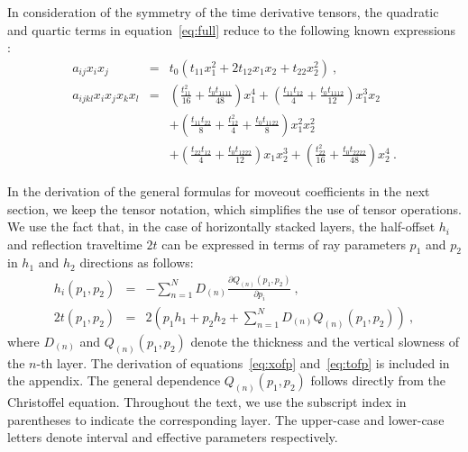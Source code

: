 In consideration of the symmetry of the time derivative tensors, the quadratic and quartic terms in equation~\ref{eq:full} reduce to the following known expressions \cite[]{alortho}:
\begin{eqnarray}
\label{eq:coeffgeneralsymmetric}
a_{ij}x_ix_j & = & t_0\left( t_{11}x^2_1 + 2t_{12}x_1 x_2 + t_{22} x^2_2 \right)~,\\
a_{ijkl}x_ix_jx_kx_l & = & \left( \frac{t^2_{11}}{16} + \frac{t_0t_{1111}}{48}\right)x^4_1 + \left( \frac{t_{11}t_{12}}{4} + \frac{t_0t_{1112}}{12}\right)x^3_1 x_2 ~\\
\nonumber
    && + \left( \frac{t_{11}t_{22}}{8} + \frac{t^2_{12}}{4} + \frac{t_0t_{1122}}{8}\right)x^2_1 x^2_2\\
\nonumber
    && + \left( \frac{t_{22}t_{12}}{4} + \frac{t_0t_{1222}}{12}\right) x_1 x^3_2 + \left( \frac{t^2_{22}}{16} + \frac{t_0t_{2222}}{48}\right)x^4_2~.
\end{eqnarray}


In the derivation of the general formulas for moveout coefficients in the next section, we keep the  tensor notation, which simplifies the use of tensor operations. We  use the fact that, in the case of horizontally stacked layers, the half-offset $h_i$ and reflection traveltime $2t$ can be expressed in terms of ray parameters\new{)} $p_1$ and $p_2$ in $h_1$ and $h_2$ directions as follows:
\begin{eqnarray}
\label{eq:xofp}
h_i(p_1,p_2) & = &  -\sum\limits^N_{n=1} D_{(n)}  \frac{\partial Q_{(n)}(p_1,p_2)}{\partial p_i}~,\\
\label{eq:tofp}
2t(p_1,p_2)  & = & 2\left(p_1 h_1 +p_2 h_2 + \sum\limits^N_{n=1} D_{(n)}  Q_{(n)}(p_1,p_2)\right)~, 
\end{eqnarray}
where $D_{(n)} $ and $Q_{(n)}(p_1,p_2)$ denote the thickness and the vertical slowness of the $n$-th layer. The derivation of equations~\ref{eq:xofp} and~\ref{eq:tofp} is included in the appendix. The general dependence $Q_{(n)}(p_1,p_2)$ follows directly from the Christoffel equation. Throughout the text, we use the subscript index in parentheses to indicate the corresponding layer. The upper-case and lower-case letters denote interval and effective parameters respectively. 


